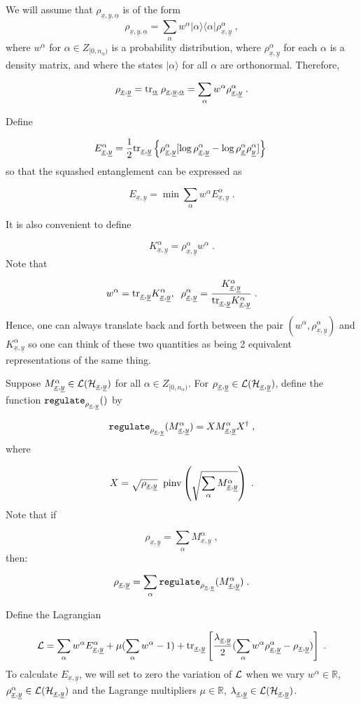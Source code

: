 \documentclass[12pt]{article}%
\newcommand{\bra}[1]{\langle#1|}
\newcommand{\ket}[1]{|#1\rangle}
\newcommand{\tr}[0]{{\rm tr }}
\newcommand{\beq}{\begin{equation}}
\newcommand{\eeq}{\end{equation}}
\newcommand{\ul}[1]{\underline{#1}}
\newcommand{\RR}[0]{{ \mathbb{R}} }
\newcommand{\rvx}[0]{{\ul{x}}}
\newcommand{\rvy}[0]{{\ul{y}}}
\newcommand{\calh}[0]{{\cal H}}
\newcommand{\call}[0]{{\cal L}}
\newcommand{\lam}[0]{\lambda}
\newcommand{\rvalp}[0]{{\ul{\alpha}}}
\newcommand{\alp}[0]{{\alpha}}
\begin{document}
We will assume that $\rho_{\rvx, \rvy, \rvalp}$
is of the form
\beq
\rho_{\rvx, \rvy, \rvalp} =
\sum_\alp w^\alp \ket{\alp}\bra{\alp} \rho_{\rvx, \rvy}^\alp
\;,
\eeq
where $w^\alp$ for $\alp\in Z_{[0, n_\rvalp)}$
is a probability distribution, where $\rho^\alp_{\rvx, \rvy}$
for each $\alp$ is a density matrix,
and where the states $\ket{\alp}$
for all $\alp$ are orthonormal.
Therefore,

\beq
\rho_{\rvx, \rvy} =
\tr_\rvalp\; \rho_{\rvx, \rvy, \rvalp} =
\sum_\alp
w^\alp \rho_{\rvx, \rvy}^\alp
\;.
\eeq

Define


\beq
E^\alp_{\rvx, \rvy}=\frac{1}{2}\tr_{\rvx, \rvy}\left\{
\rho^{\alp}_{\rvx,\rvy}[
\log \rho^{\alp}_{\rvx,\rvy}
-
\log \rho^{\alp}_{\rvx}
\rho^{\alp}_{\rvy}]
\right\}
\;
\eeq
so that the squashed entanglement can be expressed as


\beq
E_{\rvx, \rvy}=\min
\sum_\alp w^\alp
E^\alp_{\rvx, \rvy}
\;.
\eeq

It is also convenient to define

\beq
K^\alp_{\rvx, \rvy}=\rho^\alp_{\rvx, \rvy}w^\alp
\;.
\eeq
Note that

\beq
w^\alp=\tr_{\rvx, \rvy}K^\alp_{\rvx, \rvy}, \;\;
\rho^\alp_{\rvx, \rvy}=\frac{K^\alp_{\rvx, \rvy}}{\tr_{\rvx, \rvy}K^\alp_{\rvx, \rvy}}
\;.
\eeq
Hence, one can always translate back and forth
between the pair $(w^\alp, \rho^\alp_{\rvx, \rvy})$ and
$K^\alp_{\rvx, \rvy}$ so one can think of these two quantities as being
2 equivalent representations of the same thing.

Suppose $M^\alp_{\rvx, \rvy}\in \call(\calh_{\rvx, \rvy})$ for all $\alp\in Z_{[0, n_\rvalp)}$.
For $\rho_{\rvx, \rvy}\in\call(\calh_{\rvx, \rvy})$, define the function ${\tt regulate}_{\rho_{\rvx, \rvy}}()$
by


\beq
{\tt regulate}_{\rho_{\rvx, \rvy}}(M^\alp_{\rvx, \rvy}) = X M^\alp_{\rvx, \rvy} X^\dag
 \;,
\eeq
where

\beq
X= \sqrt{\rho_{\rvx, \rvy}}\;\;{\rm pinv}
\left(\sqrt{\sum_\alp M^\alp_{\rvx, \rvy}}\right)
\;.
\eeq
Note that if 

\beq 
\rho_{\rvx, \rvy}=\sum_\alp M^\alp_{\rvx, \rvy}
\;,
\eeq
then:

\beq
\rho_{\rvx, \rvy}= \sum_\alp {\tt regulate}_{\rho_{\rvx, \rvy}}(M^\alp_{\rvx, \rvy})
\;.
\eeq

Define the Lagrangian

\beq
{\cal L}=
\sum_\alp w^\alp
E^\alp_{\rvx, \rvy}
+ \mu(\sum_\alp w^\alp -1)
+\tr_{\rvx, \rvy}\left[
\frac{\lam_{\rvx, \rvy}}{2}(\sum_\alp w^\alp
\rho^\alp_{\rvx, \rvy}-\rho_{\rvx,\rvy})
\right]
\;.
\eeq
To calculate $E_{\rvx, \rvy}$, we will set to zero
the variation of $\call$ when we vary $w^\alp\in \RR$, $\rho^\alp_{\rvx,\rvy}
\in \call(\calh_{\rvx, \rvy})$
and the Lagrange multipliers $\mu\in \RR$, $\lam_{\rvx, \rvy}\in\call(\calh_{\rvx, \rvy})$.
\end{document}
